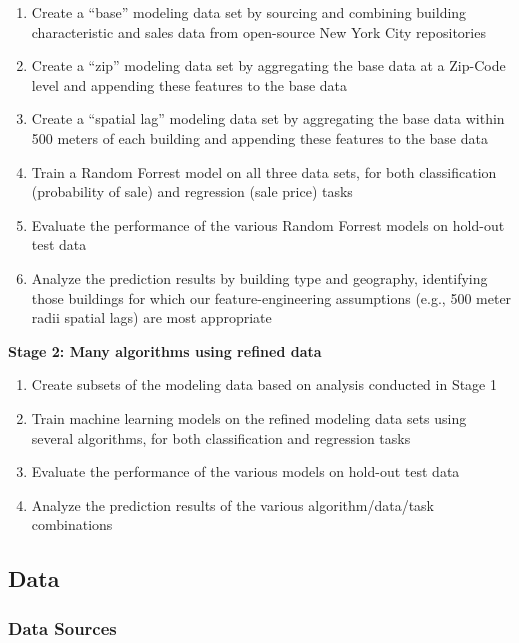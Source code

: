 \documentclass[12pt,]{article}
\providecommand{\tightlist}{%
  \setlength{\itemsep}{0pt}\setlength{\parskip}{0pt}}
\begin{document}
\begin{enumerate}
\def\labelenumi{\arabic{enumi})}
\tightlist
\item
  Create a ``base'' modeling data set by sourcing and combining building
  characteristic and sales data from open-source New York City
  repositories
\item
  Create a ``zip'' modeling data set by aggregating the base data at a
  Zip-Code level and appending these features to the base data
\item
  Create a ``spatial lag'' modeling data set by aggregating the base
  data within 500 meters of each building and appending these features
  to the base data
\item
  Train a Random Forrest model on all three data sets, for both
  classification (probability of sale) and regression (sale price) tasks
\item
  Evaluate the performance of the various Random Forrest models on
  hold-out test data
\item
  Analyze the prediction results by building type and geography,
  identifying those buildings for which our feature-engineering
  assumptions (e.g., 500 meter radii spatial lags) are most
  appropriate\newline
\end{enumerate}

\noindent \textbf{Stage 2: Many algorithms using refined data}

\begin{enumerate}
\def\labelenumi{\arabic{enumi})}
\setcounter{enumi}{6}
\tightlist
\item
  Create subsets of the modeling data based on analysis conducted in
  Stage 1
\item
  Train machine learning models on the refined modeling data sets using
  several algorithms, for both classification and regression tasks
\item
  Evaluate the performance of the various models on hold-out test data
\item
  Analyze the prediction results of the various algorithm/data/task
  combinations
\end{enumerate}

\hypertarget{data}{%
\subsection{Data}\label{data}}

\hypertarget{data-sources}{%
\subsubsection{Data Sources}\label{data-sources}}
\end{document}
